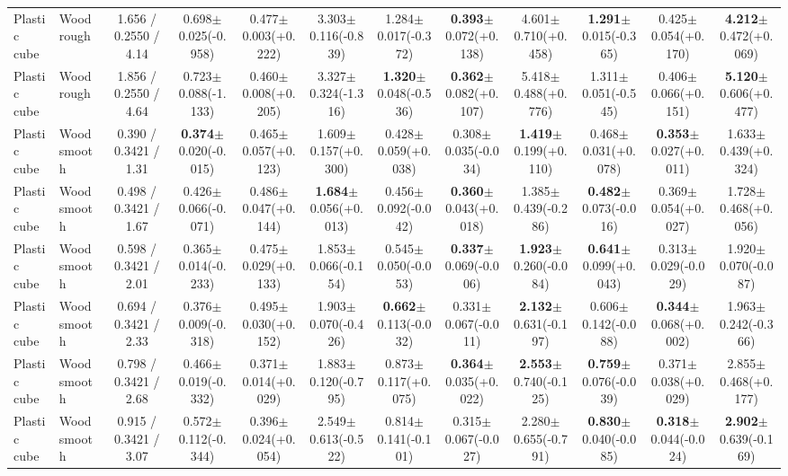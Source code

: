 \begin{table}[t]
{\begin{tabular}{l l c c c c c c c c c c }
        Plastic cube & Wood rough & 1.656 / 0.2550 / 4.14 & 0.698$\pm$0.025(-0.958) & 0.477$\pm$0.003(+0.222) & 3.303$\pm$0.116(-0.839) & 1.284$\pm$0.017(-0.372) & \textbf{0.393}$\pm$0.072(+0.138) & 4.601$\pm$0.710(+0.458) & \textbf{1.291}$\pm$0.015(-0.365) & 0.425$\pm$0.054(+0.170) & \textbf{4.212}$\pm$0.472(+0.069) \\
        Plastic cube & Wood rough & 1.856 / 0.2550 / 4.64 & 0.723$\pm$0.088(-1.133) & 0.460$\pm$0.008(+0.205) & 3.327$\pm$0.324(-1.316) & \textbf{1.320}$\pm$0.048(-0.536) & \textbf{0.362}$\pm$0.082(+0.107) & 5.418$\pm$0.488(+0.776) & 1.311$\pm$0.051(-0.545) & 0.406$\pm$0.066(+0.151) & \textbf{5.120}$\pm$0.606(+0.477) \\
        Plastic cube & Wood smooth & 0.390 / 0.3421 / 1.31 & \textbf{0.374}$\pm$0.020(-0.015) & 0.465$\pm$0.057(+0.123) & 1.609$\pm$0.157(+0.300) & 0.428$\pm$0.059(+0.038) & 0.308$\pm$0.035(-0.034) & \textbf{1.419}$\pm$0.199(+0.110) & 0.468$\pm$0.031(+0.078) & \textbf{0.353}$\pm$0.027(+0.011) & 1.633$\pm$0.439(+0.324) \\
        Plastic cube & Wood smooth & 0.498 / 0.3421 / 1.67 & 0.426$\pm$0.066(-0.071) & 0.486$\pm$0.047(+0.144) & \textbf{1.684}$\pm$0.056(+0.013) & 0.456$\pm$0.092(-0.042) & \textbf{0.360}$\pm$0.043(+0.018) & 1.385$\pm$0.439(-0.286) & \textbf{0.482}$\pm$0.073(-0.016) & 0.369$\pm$0.054(+0.027) & 1.728$\pm$0.468(+0.056) \\
        Plastic cube & Wood smooth & 0.598 / 0.3421 / 2.01 & 0.365$\pm$0.014(-0.233) & 0.475$\pm$0.029(+0.133) & 1.853$\pm$0.066(-0.154) & 0.545$\pm$0.050(-0.053) & \textbf{0.337}$\pm$0.069(-0.006) & \textbf{1.923}$\pm$0.260(-0.084) & \textbf{0.641}$\pm$0.099(+0.043) & 0.313$\pm$0.029(-0.029) & 1.920$\pm$0.070(-0.087) \\
        Plastic cube & Wood smooth & 0.694 / 0.3421 / 2.33 & 0.376$\pm$0.009(-0.318) & 0.495$\pm$0.030(+0.152) & 1.903$\pm$0.070(-0.426) & \textbf{0.662}$\pm$0.113(-0.032) & 0.331$\pm$0.067(-0.011) & \textbf{2.132}$\pm$0.631(-0.197) & 0.606$\pm$0.142(-0.088) & \textbf{0.344}$\pm$0.068(+0.002) & 1.963$\pm$0.242(-0.366) \\
        Plastic cube & Wood smooth & 0.798 / 0.3421 / 2.68 & 0.466$\pm$0.019(-0.332) & 0.371$\pm$0.014(+0.029) & 1.883$\pm$0.120(-0.795) & 0.873$\pm$0.117(+0.075) & \textbf{0.364}$\pm$0.035(+0.022) & \textbf{2.553}$\pm$0.740(-0.125) & \textbf{0.759}$\pm$0.076(-0.039) & 0.371$\pm$0.038(+0.029) & 2.855$\pm$0.468(+0.177) \\
        Plastic cube & Wood smooth & 0.915 / 0.3421 / 3.07 & 0.572$\pm$0.112(-0.344) & 0.396$\pm$0.024(+0.054) & 2.549$\pm$0.613(-0.522) & 0.814$\pm$0.141(-0.101) & 0.315$\pm$0.067(-0.027) & 2.280$\pm$0.655(-0.791) & \textbf{0.830}$\pm$0.040(-0.085) & \textbf{0.318}$\pm$0.044(-0.024) & \textbf{2.902}$\pm$0.639(-0.169) \\

\end{tabular}}
\end{table}
